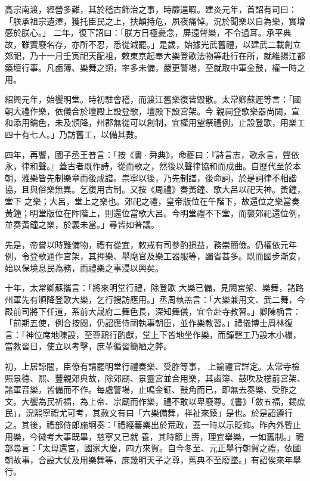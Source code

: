 
\begin{pinyinscope}

 高宗南渡，經營多難，其於稽古飾治之事，時靡遑暇。建炎元年，首詔有司曰：「朕承祖宗遺澤，獲托臣民之上，扶顛持危，夙夜痛悼。況於聞樂以自為樂，實增感於朕心。」
 二年，復下詔曰：「朕方日極憂念，屏遠聲樂，不令過耳。承平典故，雖實廢名存，亦所不忍，悉從減罷。」是歲，始據光武舊禮，以建武二載創立郊祀，乃十一月壬寅祀天配祖，敕東京起奉大樂登歌法物等赴行在所，就維揚江都築壇行事。凡鹵簿、樂舞之類，率多未備，嚴更警場，至就取中軍金鼓，權一時之用。



 紹興元年，始饗明堂。時初駐會稽，而渡江舊樂復皆毀散。太常卿蘇遲等言：「國朝大禮作樂，依儀合於壇殿上設登歌，壇殿下設宮架。今
 親祠登歌樂器尚闕，宣和添用鑰色，未及頒降，州郡無從可以創制，宜權用望祭禮例，止設登歌，用樂工四十有七人。」乃訪舊工，以備其數。



 四年，再饗，國子丞王普言：「按《書·舜典》，命夔曰：『詩言志，歌永言，聲依永，律和聲。』蓋古者既作詩，從而歌之，然後以聲律協和而成曲。自歷代至於本朝，雅樂皆先制樂章而後成譜。祟寧以後，乃先制譜，後命詞，於是詞律不相諧協，且與俗樂無異。乞復用古制。又按《周禮》奏黃鐘、歌大呂以祀天神。黃鐘，堂下
 之樂；大呂，堂上之樂也。郊祀之禮，皇帝版位在午階下，故還位之樂當奏黃鐘；明堂版位在阼階上，則還位當歌大呂。今明堂禮不下堂，而襲郊祀還位例，並奏黃鐘之樂，於義未當。」尋皆如普議。



 先是，帝嘗以時難備物，禮有從宜，敕戒有司參酌損益，務崇簡儉。仍權依元年例，令登歌通作宮架，其押樂、舉麾官及樂工器服等，蠲省甚多。既而國步漸安，始以保境息民為務，而禮樂之事浸以興矣。



 十年，太常卿蘇攜言：「將來明堂行禮，除登歌
 大樂已備，見闕宮架、樂舞，諸路州軍先有頒降登歌大樂，乞行搜訪應用。」丞周執羔言：「大樂兼用文、武二舞，今殿前司將下任道，系前大晟府二舞色長，深知舞儀，宜令赴寺教習。」卿陳桷言：「前期五使，例合按閱，仍詔應侍祠執事朝臣，並作樂教習。」禮儀博士周林復言：「神位席地陳設，至尊親行酌獻，堂上下皆地坐作樂，而鐘磬工乃設木小榻，當教習日，使立以考擊，庶革循習簡陋之弊。



 初，上居諒闇，臣僚有請罷明堂行禮奏樂、受胙等事，
 上諭禮官詳定。太常寺檢照景德、熙、豐親郊典故，除郊廟、景靈宮並合用樂，其鹵簿、鼓吹及樓前宮架、諸軍音樂，皆備而不作。每處警場，止鳴金鉦、鼓角而已，即無去奏樂、受胙之文。大饗為民祈福，為上帝、宗廟而作樂，禮不敢以卑廢尊。《書》「斂五福，錫庶民」，況熙寧禮尤可考，其赦文有曰「六樂備舞，祥祉來臻」是也。於是詔遵行之。其後，禮部侍郎施坰奏：「禮經蕃樂出於荒政，蓋一時以示貶抑。昨內外暫止用樂，今徽考大事既畢，慈寧又已就
 養，其時節上壽，理宜舉樂，一如舊制。」禮部尋言：「太母還宮，國家大慶，四方來賀。自今冬至、元正舉行朝賀之禮，依國朝故事，合設大仗及用樂舞等，庶幾明天子之尊，舊典不至廢墜。」有詔俟來年舉行。




\end{pinyinscope}
